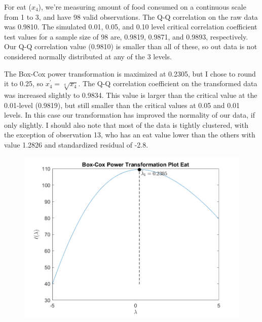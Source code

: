 For eat ($x_{4}$), we're measuring amount of food consumed on a continuous scale from 1 to 3, and have 98 valid observations. The Q-Q correlation on the raw data was 0.9810. The simulated 0.01, 0.05, and 0.10 level critical correlation coefficient test values for a sample size of 98 are, 0.9819, 0.9871, and 0.9893, respectively. Our Q-Q correlation value (0.9810) is smaller than all of these, so out data is not considered normally distributed at any of the 3 levels.

The Box-Cox power transformation is maximized at 0.2305, but I chose to round it to 0.25, so $x_{4}^{\prime} = \sqrt[4]{x_{4}}$. The Q-Q correlation coefficient on the transformed data was increased slightly to 0.9834. This value is larger than the critical value at the 0.01-level (0.9819), but still smaller than the critical values at 0.05 and 0.01 levels. In this case our transformation has improved the normality of our data, if only slightly. I should also note that most of the data is tightly clustered, with the exception of observation 13, who has an eat value lower than the others with value 1.2826 and standardized residual of -2.8.

\begin{center}
    \begin{figure}[H]
        \centering
        \includegraphics[scale=0.6]{./matlab/chapter-4/sol4.32.power.4.png}
    \end{figure}
\end{center}

